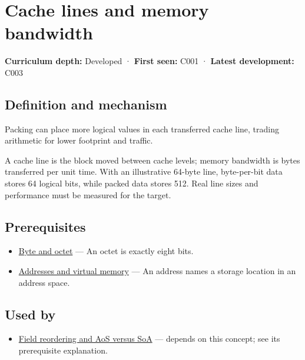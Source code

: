 \hypertarget{appendix-e4ccdbab8320}{}\label{referencestart:appendix-e4ccdbab8320}
\section{Cache lines and memory bandwidth}\label{appendix-e4ccdbab8320-cache-lines-and-memory-bandwidth}

\textbf{Curriculum depth:} Developed · \textbf{First seen:} C001 · \textbf{Latest development:} C003

\subsection{Definition and mechanism}\label{appendix-e4ccdbab8320-definition-and-mechanism}

Packing can place more logical values in each transferred cache line, trading arithmetic for lower footprint and traffic.

A cache line is the block moved between cache levels; memory bandwidth is bytes transferred per unit time. With an illustrative 64-byte line, byte-per-bit data stores 64 logical bits, while packed data stores 512. Real line sizes and performance must be measured for the target.

\subsection{Prerequisites}\label{appendix-e4ccdbab8320-prerequisites}

\begin{itemize}
\tightlist
\item
  \hyperref[appendix-5bee2df85484]{Byte and octet} --- An octet is exactly eight bits.
\item
  \hyperref[appendix-18ee4f913c3c]{Addresses and virtual memory} --- An address names a storage location in an address space.
\end{itemize}

\subsection{Used by}\label{appendix-e4ccdbab8320-used-by}

\begin{itemize}
\tightlist
\item
  \hyperref[appendix-5522ad176ca0]{Field reordering and AoS versus SoA} --- depends on this concept; see its prerequisite explanation.
\end{itemize}

